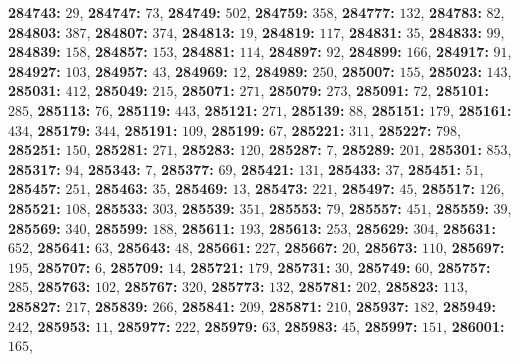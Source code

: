\textsf{\bfseries 284743:} $29$, \textsf{\bfseries 284747:} $73$, \textsf{\bfseries 284749:} $502$, \textsf{\bfseries 284759:} $358$, \textsf{\bfseries 284777:} $132$, \textsf{\bfseries 284783:} $82$, \textsf{\bfseries 284803:} $387$, \textsf{\bfseries 284807:} $374$, \textsf{\bfseries 284813:} $19$, \textsf{\bfseries 284819:} $117$, \textsf{\bfseries 284831:} $35$, \textsf{\bfseries 284833:} $99$, \textsf{\bfseries 284839:} $158$, \textsf{\bfseries 284857:} $153$, \textsf{\bfseries 284881:} $114$, \textsf{\bfseries 284897:} $92$, \textsf{\bfseries 284899:} $166$, \textsf{\bfseries 284917:} $91$, \textsf{\bfseries 284927:} $103$, \textsf{\bfseries 284957:} $43$, \textsf{\bfseries 284969:} $12$, \textsf{\bfseries 284989:} $250$, \textsf{\bfseries 285007:} $155$, \textsf{\bfseries 285023:} $143$, \textsf{\bfseries 285031:} $412$, \textsf{\bfseries 285049:} $215$, \textsf{\bfseries 285071:} $271$, \textsf{\bfseries 285079:} $273$, \textsf{\bfseries 285091:} $72$, \textsf{\bfseries 285101:} $285$, \textsf{\bfseries 285113:} $76$, \textsf{\bfseries 285119:} $443$, \textsf{\bfseries 285121:} $271$, \textsf{\bfseries 285139:} $88$, \textsf{\bfseries 285151:} $179$, \textsf{\bfseries 285161:} $434$, \textsf{\bfseries 285179:} $344$, \textsf{\bfseries 285191:} $109$, \textsf{\bfseries 285199:} $67$, \textsf{\bfseries 285221:} $311$, \textsf{\bfseries 285227:} $798$, \textsf{\bfseries 285251:} $150$, \textsf{\bfseries 285281:} $271$, \textsf{\bfseries 285283:} $120$, \textsf{\bfseries 285287:} $7$, \textsf{\bfseries 285289:} $201$, \textsf{\bfseries 285301:} $853$, \textsf{\bfseries 285317:} $94$, \textsf{\bfseries 285343:} $7$, \textsf{\bfseries 285377:} $69$, \textsf{\bfseries 285421:} $131$, \textsf{\bfseries 285433:} $37$, \textsf{\bfseries 285451:} $51$, \textsf{\bfseries 285457:} $251$, \textsf{\bfseries 285463:} $35$, \textsf{\bfseries 285469:} $13$, \textsf{\bfseries 285473:} $221$, \textsf{\bfseries 285497:} $45$, \textsf{\bfseries 285517:} $126$, \textsf{\bfseries 285521:} $108$, \textsf{\bfseries 285533:} $303$, \textsf{\bfseries 285539:} $351$, \textsf{\bfseries 285553:} $79$, \textsf{\bfseries 285557:} $451$, \textsf{\bfseries 285559:} $39$, \textsf{\bfseries 285569:} $340$, \textsf{\bfseries 285599:} $188$, \textsf{\bfseries 285611:} $193$, \textsf{\bfseries 285613:} $253$, \textsf{\bfseries 285629:} $304$, \textsf{\bfseries 285631:} $652$, \textsf{\bfseries 285641:} $63$, \textsf{\bfseries 285643:} $48$, \textsf{\bfseries 285661:} $227$, \textsf{\bfseries 285667:} $20$, \textsf{\bfseries 285673:} $110$, \textsf{\bfseries 285697:} $195$, \textsf{\bfseries 285707:} $6$, \textsf{\bfseries 285709:} $14$, \textsf{\bfseries 285721:} $179$, \textsf{\bfseries 285731:} $30$, \textsf{\bfseries 285749:} $60$, \textsf{\bfseries 285757:} $285$, \textsf{\bfseries 285763:} $102$, \textsf{\bfseries 285767:} $320$, \textsf{\bfseries 285773:} $132$, \textsf{\bfseries 285781:} $202$, \textsf{\bfseries 285823:} $113$, \textsf{\bfseries 285827:} $217$, \textsf{\bfseries 285839:} $266$, \textsf{\bfseries 285841:} $209$, \textsf{\bfseries 285871:} $210$, \textsf{\bfseries 285937:} $182$, \textsf{\bfseries 285949:} $242$, \textsf{\bfseries 285953:} $11$, \textsf{\bfseries 285977:} $222$, \textsf{\bfseries 285979:} $63$, \textsf{\bfseries 285983:} $45$, \textsf{\bfseries 285997:} $151$, \textsf{\bfseries 286001:} $165$, 
